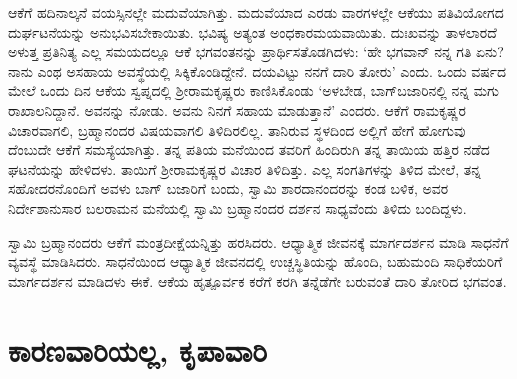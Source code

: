 ಆಕೆಗೆ ಹದಿನಾಲ್ಕನೆ ವಯಸ್ಸಿನಲ್ಲೇ ಮದುವೆಯಾಗಿತ್ತು. ಮದುವೆಯಾದ ಎರಡು ವಾರಗಳಲ್ಲೇ ಆಕೆಯು ಪತಿವಿಯೋಗದ ದುರ್ಘಟನೆಯನ್ನು ಅನುಭವಿಸಬೇಕಾಯಿತು. ಭವಿಷ್ಯ ಅತ್ಯಂತ ಅಂಧಕಾರಮಯವಾಯಿತು. ದುಃಖವನ್ನು ತಾಳಲಾರದೆ ಅಳುತ್ತ ಪ್ರತಿನಿತ್ಯ ಎಲ್ಲ ಸಮಯದಲ್ಲೂ ಆಕೆ ಭಗವಂತನನ್ನು ಪ್ರಾರ್ಥಿಸತೊಡಗಿದಳು: ‘ಹೇ ಭಗವಾನ್ ನನ್ನ ಗತಿ ಏನು? ನಾನು ಎಂಥ ಅಸಹಾಯ ಅವಸ್ಥೆಯಲ್ಲಿ ಸಿಕ್ಕಿಕೊಂಡಿದ್ದೇನೆ. ದಯವಿಟ್ಟು ನನಗೆ ದಾರಿ ತೋರು’ ಎಂದು. ಒಂದು ವರ್ಷದ ಮೇಲೆ ಒಂದು ದಿನ ಆಕೆಯ ಸ್ವಪ್ನದಲ್ಲಿ ಶ‍್ರೀರಾಮಕೃಷ್ಣರು ಕಾಣಿಸಿಕೊಂಡು ‘ಅಳಬೇಡ, ಬಾಗ್​ಬಜಾರಿನಲ್ಲಿ ನನ್ನ ಮಗು ರಾಖಾಲನಿದ್ದಾನೆ. ಅವನನ್ನು ನೋಡು. ಅವನು ನಿನಗೆ ಸಹಾಯ ಮಾಡುತ್ತಾನೆ’ ಎಂದರು. ಆಕೆಗೆ ರಾಮಕೃಷ್ಣರ ವಿಚಾರವಾಗಲಿ, ಬ್ರಹ್ಮಾನಂದರ ವಿಷಯವಾಗಲಿ ತಿಳಿದಿರಲಿಲ್ಲ. ತಾನಿರುವ ಸ್ಥಳದಿಂದ ಅಲ್ಲಿಗೆ ಹೇಗೆ ಹೋಗುವು ದೆಂಬುದೇ ಆಕೆಗೆ ಸಮಸ್ಯೆಯಾಗಿತ್ತು. ತನ್ನ ಪತಿಯ ಮನೆಯಿಂದ ತವರಿಗೆ ಹಿಂದಿರುಗಿ ತನ್ನ ತಾಯಿಯ ಹತ್ತಿರ ನಡೆದ ಘಟನೆಯನ್ನು ಹೇಳಿದಳು. ತಾಯಿಗೆ ಶ‍್ರೀರಾಮಕೃಷ್ಣರ ವಿಚಾರ ತಿಳಿದಿತ್ತು. ಎಲ್ಲ ಸಂಗತಿಗಳನ್ನು ತಿಳಿದ ಮೇಲೆ, ತನ್ನ ಸಹೋದರನೊಂದಿಗೆ ಅವಳು ಬಾಗ್ ಬಜಾರಿಗೆ ಬಂದು, ಸ್ವಾಮಿ ಶಾರದಾನಂದರನ್ನು ಕಂಡ ಬಳಿಕ, ಅವರ ನಿರ್ದೇಶಾನುಸಾರ ಬಲರಾಮನ ಮನೆಯಲ್ಲಿ ಸ್ವಾಮಿ ಬ್ರಹ್ಮಾನಂದರ ದರ್ಶನ ಸಾಧ್ಯವೆಂದು ತಿಳಿದು ಬಂದಿದ್ದಳು.

ಸ್ವಾಮಿ ಬ್ರಹ್ಮಾನಂದರು ಆಕೆಗೆ ಮಂತ್ರದೀಕ್ಷೆಯನ್ನಿತ್ತು ಹರಸಿದರು. ಆಧ್ಯಾತ್ಮಿಕ ಜೀವನಕ್ಕೆ ಮಾರ್ಗದರ್ಶನ ಮಾಡಿ ಸಾಧನೆಗೆ ವ್ಯವಸ್ಥೆ ಮಾಡಿಸಿದರು. ಸಾಧನೆಯಿಂದ ಆಧ್ಯಾತ್ಮಿಕ ಜೀವನದಲ್ಲಿ ಉಚ್ಚಸ್ಥಿತಿಯನ್ನು ಹೊಂದಿ, ಬಹುಮಂದಿ ಸಾಧಿಕೆಯರಿಗೆ ಮಾರ್ಗದರ್ಶನ ಮಾಡಿದಳು ಈಕೆ. ಆಕೆಯ ಹೃತ್ಪೂರ್ವಕ ಕರೆಗೆ ಕರಗಿ ತನ್ನೆಡೆಗೇ ಬರುವಂತೆ ದಾರಿ ತೋರಿದ ಭಗವಂತ.


\section*{ಕಾರಣವಾರಿಯಲ್ಲ, ಕೃಪಾವಾರಿ}


